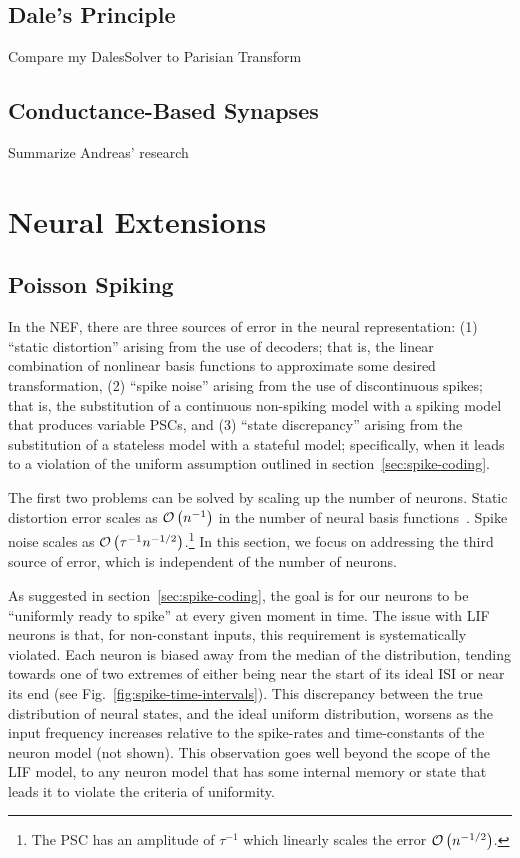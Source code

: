 \subsection{Dale's Principle}

Compare my DalesSolver to Parisian Transform

\subsection{Conductance-Based Synapses}

Summarize Andreas' research


\section{Neural Extensions}

\subsection{Poisson Spiking}
\label{sec:poisson-spiking}

In the NEF, there are three sources of error in the neural representation: (1) ``static distortion'' arising from the use of decoders; that is, the linear combination of nonlinear basis functions to approximate some desired transformation, (2) ``spike noise'' arising from the use of discontinuous spikes; that is, the substitution of a continuous non-spiking model with a spiking model that produces variable PSCs, and (3) ``state discrepancy'' arising from the substitution of a stateless model with a stateful model; specifically, when it leads to a violation of the uniform assumption outlined in section~\ref{sec:spike-coding}.

The first two problems can be solved by scaling up the number of neurons.
Static distortion error scales as $\mathcal{O}\left({n^{-1}}\right)$ in the number of neural basis functions~\citep{eliasmith2003a}.
Spike noise scales as $\mathcal{O}\left({ \tau^{-1} n^{-1/2} }\right)$.\footnote{The PSC has an amplitude of $\tau^{-1}$ which linearly scales the error $\mathcal{O}\left({n^{-1/2}}\right)$.}
In this section, we focus on addressing the third source of error, which is independent of the number of neurons.

As suggested in section~\ref{sec:spike-coding}, the goal is for our neurons to be ``uniformly ready to spike'' at every given moment in time.
The issue with LIF neurons is that, for non-constant inputs, this requirement is systematically violated.
Each neuron is biased away from the median of the distribution, tending towards one of two extremes of either being near the start of its ideal ISI or near its end (see Fig.~\ref{fig:spike-time-intervals}).
This discrepancy between the true distribution of neural states, and the ideal uniform distribution, worsens as the input frequency increases relative to the spike-rates and time-constants of the neuron model (not shown).
This observation goes well beyond the scope of the LIF model, to any neuron model that has some internal memory or state that leads it to violate the criteria of uniformity.

